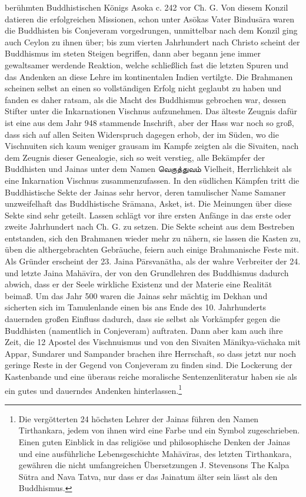 \documentclass{article}
\newcommand{\TamilText}[1]{\texttamil{#1}}
\newcommand{\tam}[1]{\TamilText{#1}}
\begin{document}
berühmten Buddhistischen Königs Asoka c. 242 vor Ch. G. Von diesem Konzil datieren die erfolgreichen Missionen, schon unter As\={o}kas Vater Bindus\={a}ra waren die Buddhisten bis Conjeveram vorgedrungen, unmittelbar nach dem Konzil ging auch Ceylon zu ihnen über; bis zum vierten Jahrhundert nach Christo scheint der Buddhismus im steten Steigen begriffen, dann aber begann jene immer gewaltsamer werdende Reaktion, welche schließlich fast die letzten Spuren und das Andenken an diese Lehre im kontinentalen Indien vertilgte. Die Brahmanen scheinen selbst an einen so vollständigen Erfolg nicht geglaubt zu haben und fanden es daher ratsam, als die Macht des Buddhismus gebrochen war, dessen Stifter unter die Inkarnationen Vischnus aufzunehmen. Das älteste Zeugnis dafür ist eine aus dem Jahr 948 stammende Inschrift, aber der Hass war noch so groß, dass sich auf allen Seiten Widerspruch dagegen erhob, der im Süden, wo die Vischnuiten sich kaum weniger grausam im Kampfe zeigten als die Sivaiten, nach dem Zeugnis dieser Genealogie, sich so weit verstieg, alle Bekämpfer der Buddhisten und Jainas unter dem Namen \tam{வெகுத்துவம்} Vielheit, Herrlichkeit als eine Inkarnation Vischnus zusammenzufassen. In den südlichen Kämpfen tritt die Buddhistische Sekte der Jainas sehr hervor, deren tamulischer Name Samaner unzweifelhaft das Buddhistische Sr\={a}mana, Asket, ist. Die Meinungen über diese Sekte sind sehr geteilt. Lassen schlägt vor ihre ersten Anfänge in das erste oder zweite Jahrhundert nach Ch. G. zu setzen. Die Sekte scheint aus dem Bestreben entstanden, sich den Brahmanen wieder mehr zu nähern, sie lassen die Kasten zu, üben die althergebrachten Gebräuche, feiern auch einige Brahmanische Feste mit. Als Gründer erscheint der 23. Jaina P\={a}rsvan\={a}tha, als der wahre Verbreiter der 24. und letzte Jaina Mah\={a}v\={i}ra, der von den Grundlehren des Buddhismus dadurch abwich, dass er der Seele wirkliche Existenz und der Materie eine Realität beimaß. Um das Jahr 500 waren die Jainas sehr mächtig im Dekhan und sicherten sich im Tamulenlande einen bis ans Ende des 10. Jahrhunderts dauernden großen Einfluss dadurch, dass sie selbst als Vorkämpfer gegen die Buddhisten (namentlich in Conjeveram) auftraten. Dann aber kam auch ihre Zeit, die 12 Apostel des Vischnuismus und von den Sivaiten M\={a}nikya-v\={a}chaka mit Appar, Sundarer und Sampander brachen ihre Herrschaft, so dass jetzt nur noch geringe Reste in der Gegend von Conjeveram zu finden sind. Die Lockerung der Kastenbande und eine überaus reiche moralische Sentenzenliteratur haben sie als ein gutes und dauerndes Andenken hinterlassen.\footnote{Die vergötterten 24 höchsten Lehrer der Jainas führen den Namen Tirthankara, jedem von ihnen wird eine Farbe und ein Symbol zugeschrieben. Einen guten Einblick in das religiöse und philosophische Denken der Jainas und eine ausführliche Lebensgeschichte Mah\={a}v\={i}ras, des letzten Tirthankara, gewähren die nicht umfangreichen Übersetzungen J. Stevensons The Kalpa S\={u}tra and Nava Tatva, nur dass er das Jainatum älter sein lässt als den Buddhismus.}
\end{document}
